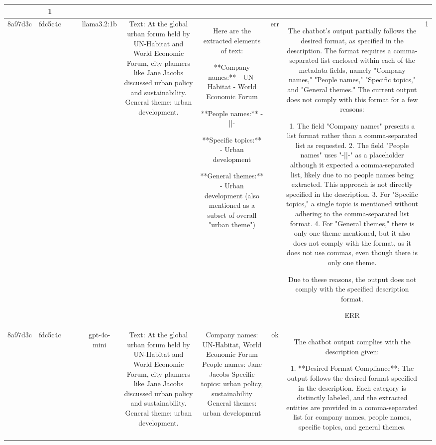 \begin{table}[h!]
\begin{tabular}{|c|c|c|c|c|c|c|c|c|c|}
{No violations are detected in terms of compliance with the description.

OK & 1\\
\hline
8a97d3c & fdc5c4c &  &  & llama3.2:1b & Text: At the global urban forum held by UN-Habitat and World Economic Forum, city planners like Jane Jacobs discussed urban policy and sustainability. General theme: urban development. & Here are the extracted elements of text:

**Company names:** 
- UN-Habitat
- World Economic Forum

**People names:** -||-

**Specific topics:** 
- Urban development

**General themes:** 
- Urban development (also mentioned as a subset of overall "urban theme") & err & The chatbot's output partially follows the desired format, as specified in the description. The format requires a comma-separated list enclosed within each of the metadata fields, namely "Company names," "People names," "Specific topics," and "General themes." The current output does not comply with this format for a few reasons: 

1. The field "Company names" presents a list format rather than a comma-separated list as requested.
2. The field "People names" uses "-||-" as a placeholder although it expected a comma-separated list, likely due to no people names being extracted. This approach is not directly specified in the description.
3. For "Specific topics," a single topic is mentioned without adhering to the comma-separated list format.
4. For "General themes," there is only one theme mentioned, but it also does not comply with the format, as it does not use commas, even though there is only one theme.

Due to these reasons, the output does not comply with the specified description format.

ERR & 1\\
\hline
8a97d3c & fdc5c4c &  &  & gpt-4o-mini & Text: At the global urban forum held by UN-Habitat and World Economic Forum, city planners like Jane Jacobs discussed urban policy and sustainability. General theme: urban development. & Company names: UN-Habitat, World Economic Forum
People names: Jane Jacobs
Specific topics: urban policy, sustainability
General themes: urban development & ok & The chatbot output complies with the description given:

1. **Desired Format Compliance**: The output follows the desired format specified in the description. Each category is distinctly labeled, and the extracted entities are provided in a comma-separated list for company names, people names, specific topics, and general themes.

}
\end{tabular}
\end{table}
